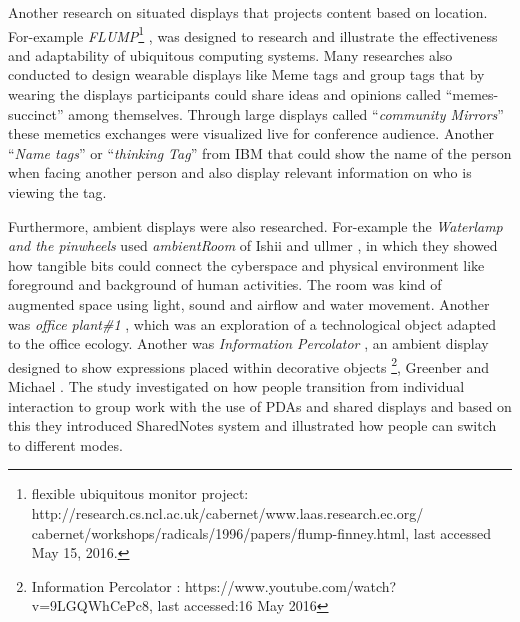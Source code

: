 Another research on situated displays that projects content based on location. For-example  \emph{FLUMP}\footnote{flexible ubiquitous monitor project: http://research.cs.ncl.ac.uk/cabernet/www.laas.research.ec.org/ \\ cabernet/workshops/radicals/1996/papers/flump-finney.html, last accessed May 15, 2016.} \cite{flump}, was designed to research and illustrate the effectiveness and adaptability of ubiquitous computing systems. Many researches also conducted to design wearable displays like Meme tags and group tags \cite{meme-tags} that by wearing the displays participants could share ideas and opinions called “memes-succinct” among themselves. Through large displays called ``\emph{community Mirrors}'' these memetics exchanges were visualized live for conference audience. Another ``\emph{Name tags}'' or ``\emph{thinking Tag}'' from IBM \cite{ibmtags} that could show the name of the person when facing another person and also display relevant information on who is viewing the tag.

Furthermore, ambient displays were also researched. For-example the \emph{Waterlamp and the pinwheels} used \emph{ambientRoom} of Ishii and ullmer \cite{ambient}, in which they showed how tangible bits could connect the cyberspace and physical environment like foreground and background of human activities. The room was kind of augmented space using light, sound and airflow and water movement. Another was \emph{office plant\#1} \cite{office_plant}, which was an exploration of a technological object adapted to the office ecology. Another was \emph{Information Percolator} \cite{information_precolator}, an ambient display designed to show expressions placed within decorative objects \footnote{Information Percolator : https://www.youtube.com/watch?v=9LGQWhCePc8, last accessed:16 May 2016},  Greenber and Michael \cite{shared_notes}. The study investigated on how people transition from individual interaction to group work with the use of PDAs and shared displays and based on this they introduced SharedNotes system and illustrated how people can switch to different modes.

